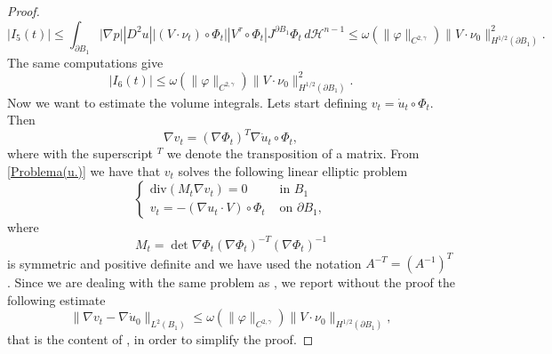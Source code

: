\documentclass[oneside,a4paper,11pt,notitlepage]{article}
\newcommand{\abs}[1]{{\left|#1\right|}}
\theoremstyle{definition}
\theoremstyle{plain}
\theoremstyle{definition}
\begin{document}
\begin{proof}
\begin{equation*}
        \abs{I_5(t)}\leq\int_{\partial B_1}\abs{\nabla p}\abs{D^2u}\abs{(V\cdot\nu_t)\circ\Phi_t}\abs{V^\tau\circ\Phi_t}J^{\partial B_1}\Phi_t\,d\mathcal{H}^{n-1}\leq \omega(\|\varphi\|_{C^{2,\gamma}})\|V\cdot\nu_0\|_{H^{1/2}(\partial B_1)}^2.
    \end{equation*}
    The same computations give
    \begin{equation*}
        \abs{I_6(t)}\leq \omega(\|\varphi\|_{C^{2,\gamma}})\|V\cdot\nu_0\|_{H^{1/2}(\partial B_1)}^2.
    \end{equation*}
    Now we want to estimate the volume integrals. Lets start defining $v_t=\dot{u}_t\circ\Phi_t$. Then
    \begin{equation*}
        \nabla v_t=(\nabla\Phi_t)^T\nabla\dot{u}_t\circ\Phi_t,
    \end{equation*}
    where with the superscript $^T$ we denote the transposition of a matrix. From \eqref{Problema(u.)} we have that $v_t$ solves the following linear elliptic problem
    \begin{equation}\label{Problema(v)}
        \begin{cases}
            \mathrm{div}(M_t\nabla v_t)=0 & \text{ in } B_1\\
            v_t=-(\nabla u_t\cdot V)\circ\Phi_t & \text{ on } \partial B_1,
        \end{cases}
    \end{equation}
    where 
    \begin{equation*}
        M_t=\det \nabla\Phi_t(\nabla\Phi_t)^{-T}(\nabla\Phi_t)^{-1}
    \end{equation*}
    is symmetric and positive definite and we have used the notation $A^{-T}=(A^{-1})^T$. Since we are dealing with the same problem as \cite{BDPV}, we report without the proof the following estimate
    \begin{equation}\label{StimaGradv}
        \|\nabla v_t-\nabla\dot{u}_0\|_{L^2(B_1)}\leq\omega(\|\varphi\|_{C^{2,\gamma}})\|V\cdot\nu_0\|_{H^{1/2}(\partial B_1)},
    \end{equation}
    that is the content of \cite[Formula A.24]{BDPV}, in order to simplify the proof.
    

\end{proof}
\end{document}
